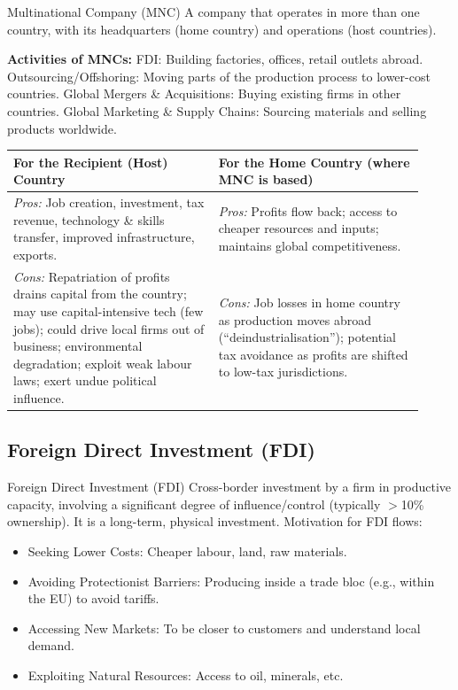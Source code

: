 \documentclass[11pt, a4paper, twoside]{book}
\begin{document}
\begin{keyterm}{Multinational Company (MNC)}
A company that operates in more than one country, with its headquarters (home country) and operations (host countries).
\end{keyterm}

\textbf{Activities of MNCs:} FDI: Building factories, offices, retail outlets abroad. Outsourcing/Offshoring: Moving parts of the production process to lower-cost countries. Global Mergers \& Acquisitions: Buying existing firms in other countries. Global Marketing \& Supply Chains: Sourcing materials and selling products worldwide.

\begin{example}
\begin{tabular}{@{}>{\RaggedRight\arraybackslash}p{0.46\linewidth}>{\RaggedRight\arraybackslash}p{0.46\linewidth}@{}}
\textbf{For the Recipient (Host) Country} & \textbf{For the Home Country (where MNC is based)} \\
\midrule
\textit{Pros:} Job creation, investment, tax revenue, technology \& skills transfer, improved infrastructure, exports. & \textit{Pros:} Profits flow back; access to cheaper resources and inputs; maintains global competitiveness. \\
\textit{Cons:} Repatriation of profits drains capital from the country; may use capital-intensive tech (few jobs); could drive local firms out of business; environmental degradation; exploit weak labour laws; exert undue political influence. & \textit{Cons:} Job losses in home country as production moves abroad (``deindustrialisation''); potential tax avoidance as profits are shifted to low-tax jurisdictions. \\
\end{tabular}
\end{example}

\subsection{Foreign Direct Investment (FDI)}

\begin{keyterm}{Foreign Direct Investment (FDI)}
Cross-border investment by a firm in productive capacity, involving a significant degree of influence/control (typically $>$10\% ownership). It is a long-term, physical investment. Motivation for FDI flows:
\begin{itemize}
  \item Seeking Lower Costs: Cheaper labour, land, raw materials.
  \item Avoiding Protectionist Barriers: Producing inside a trade bloc (e.g., within the EU) to avoid tariffs.
  \item Accessing New Markets: To be closer to customers and understand local demand.
  \item Exploiting Natural Resources: Access to oil, minerals, etc.
\end{itemize}
\end{keyterm}
\end{document}
